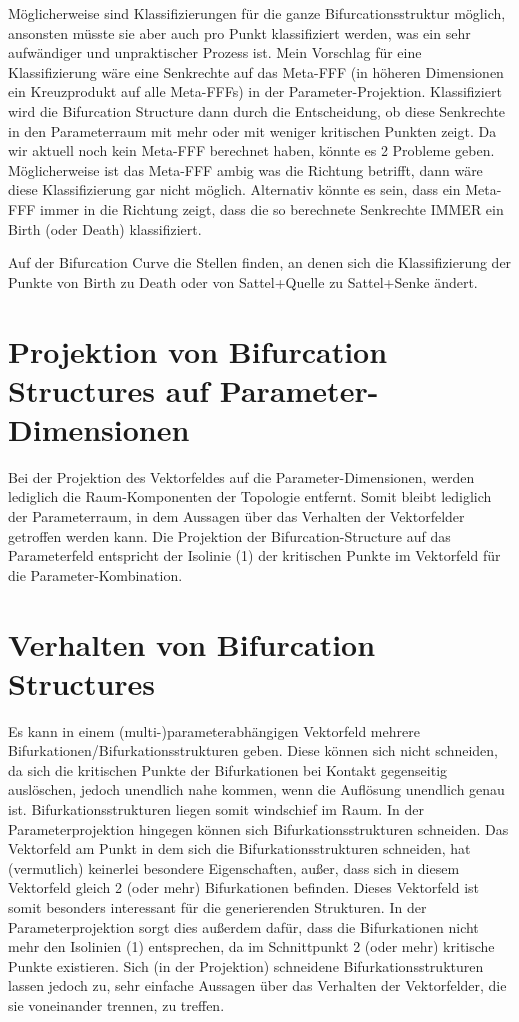 \documentclass[11pt]{article}
\begin{document}
Möglicherweise sind Klassifizierungen für die ganze Bifurcationsstruktur möglich, ansonsten müsste sie aber auch pro Punkt klassifiziert werden, was ein sehr aufwändiger und unpraktischer Prozess ist.
Mein Vorschlag für eine Klassifizierung wäre eine Senkrechte auf das Meta-FFF (in höheren Dimensionen ein Kreuzprodukt auf alle Meta-FFFs) in der Parameter-Projektion. Klassifiziert wird die Bifurcation Structure dann durch die Entscheidung, ob diese Senkrechte in den Parameterraum mit mehr oder mit weniger kritischen Punkten zeigt.
Da wir aktuell noch kein Meta-FFF berechnet haben, könnte es 2 Probleme geben. Möglicherweise ist das Meta-FFF ambig was die Richtung betrifft, dann wäre diese Klassifizierung gar nicht möglich. Alternativ könnte es sein, dass ein Meta-FFF immer in die Richtung zeigt, dass die so berechnete Senkrechte IMMER ein Birth (oder Death) klassifiziert.

Auf der Bifurcation Curve die Stellen finden, an denen sich die Klassifizierung der Punkte von Birth zu Death oder von Sattel+Quelle zu Sattel+Senke ändert.

\section{Projektion von Bifurcation Structures auf Parameter-Dimensionen}
Bei der Projektion des Vektorfeldes auf die Parameter-Dimensionen, werden lediglich die Raum-Komponenten der Topologie entfernt. Somit bleibt lediglich der Parameterraum, in dem Aussagen über das Verhalten der Vektorfelder getroffen werden kann.
Die Projektion der Bifurcation-Structure auf das Parameterfeld entspricht der Isolinie (1) der kritischen Punkte im Vektorfeld für die Parameter-Kombination.

\section{Verhalten von Bifurcation Structures}
Es kann in einem (multi-)parameterabhängigen Vektorfeld mehrere Bifurkationen/Bifurkationsstrukturen geben.
Diese können sich nicht schneiden, da sich die kritischen Punkte der Bifurkationen bei Kontakt gegenseitig auslöschen, jedoch unendlich nahe kommen, wenn die Auflösung unendlich genau ist. Bifurkationsstrukturen liegen somit windschief im Raum. 
In der Parameterprojektion hingegen können sich Bifurkationsstrukturen schneiden. Das Vektorfeld am Punkt in dem sich die Bifurkationsstrukturen schneiden, hat (vermutlich) keinerlei besondere Eigenschaften, außer, dass sich in diesem Vektorfeld gleich 2 (oder mehr) Bifurkationen befinden.
Dieses Vektorfeld ist somit besonders interessant für die generierenden Strukturen.
In der Parameterprojektion sorgt dies außerdem dafür, dass die Bifurkationen nicht mehr den Isolinien (1) entsprechen, da im Schnittpunkt 2 (oder mehr) kritische Punkte existieren.
Sich (in der Projektion) schneidene Bifurkationsstrukturen lassen jedoch zu, sehr einfache Aussagen über das Verhalten der Vektorfelder, die sie voneinander trennen, zu treffen.
\end{document}
